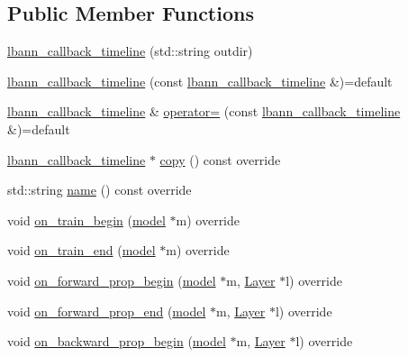 \subsection*{Public Member Functions}
\begin{DoxyCompactItemize}
\item 
\hyperlink{classlbann_1_1lbann__callback__timeline_a51afde4e9dbd97ecb1d40071df16fb78}{lbann\+\_\+callback\+\_\+timeline} (std\+::string outdir)
\item 
\hyperlink{classlbann_1_1lbann__callback__timeline_a01188f27525f2f9cc4cbf279368ec827}{lbann\+\_\+callback\+\_\+timeline} (const \hyperlink{classlbann_1_1lbann__callback__timeline}{lbann\+\_\+callback\+\_\+timeline} \&)=default
\item 
\hyperlink{classlbann_1_1lbann__callback__timeline}{lbann\+\_\+callback\+\_\+timeline} \& \hyperlink{classlbann_1_1lbann__callback__timeline_a8469e5e1a36d8ed022b803a895baa6f8}{operator=} (const \hyperlink{classlbann_1_1lbann__callback__timeline}{lbann\+\_\+callback\+\_\+timeline} \&)=default
\item 
\hyperlink{classlbann_1_1lbann__callback__timeline}{lbann\+\_\+callback\+\_\+timeline} $\ast$ \hyperlink{classlbann_1_1lbann__callback__timeline_aa1359380162f29838be3cdb0bb25b3e3}{copy} () const override
\item 
std\+::string \hyperlink{classlbann_1_1lbann__callback__timeline_aaede0408ae30a3c82f567981e374a224}{name} () const override
\item 
void \hyperlink{classlbann_1_1lbann__callback__timeline_a35a431c2545b4087d6f970d45f86c054}{on\+\_\+train\+\_\+begin} (\hyperlink{classlbann_1_1model}{model} $\ast$m) override
\item 
void \hyperlink{classlbann_1_1lbann__callback__timeline_a7af247d7f016db358da0a57f8a4b76c6}{on\+\_\+train\+\_\+end} (\hyperlink{classlbann_1_1model}{model} $\ast$m) override
\item 
void \hyperlink{classlbann_1_1lbann__callback__timeline_a9c093b091fd38b79f8632cf786d29ce2}{on\+\_\+forward\+\_\+prop\+\_\+begin} (\hyperlink{classlbann_1_1model}{model} $\ast$m, \hyperlink{classlbann_1_1Layer}{Layer} $\ast$l) override
\item 
void \hyperlink{classlbann_1_1lbann__callback__timeline_a28f4387fda222bf988d744e0b2ec8b4b}{on\+\_\+forward\+\_\+prop\+\_\+end} (\hyperlink{classlbann_1_1model}{model} $\ast$m, \hyperlink{classlbann_1_1Layer}{Layer} $\ast$l) override
\item 
void \hyperlink{classlbann_1_1lbann__callback__timeline_a81d50e48462765b5e9913ae357b5a412}{on\+\_\+backward\+\_\+prop\+\_\+begin} (\hyperlink{classlbann_1_1model}{model} $\ast$m, \hyperlink{classlbann_1_1Layer}{Layer} $\ast$l) override

\end{DoxyCompactItemize}
